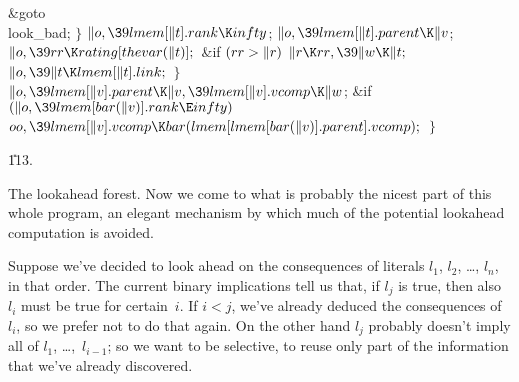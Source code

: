 \&{goto} \\{look\_bad};\6
\4${}\}{}$\2\6
${}\|o,\39\\{lmem}[\|t].\\{rank}\K\\{infty}{}$;\6
${}\|o,\39\\{lmem}[\|t].\\{parent}\K\|v{}$;\6
${}\|o,\39\\{rr}\K\\{rating}[\\{thevar}(\|t)];{}$\6
\&{if} ${}(\\{rr}>\|r){}$\1\5
${}\|r\K\\{rr},\39\|w\K\|t;{}$\2\6
${}\|o,\39\|t\K\\{lmem}[\|t].\\{link};{}$\6
\4${}\}{}$\2\6
${}\|o,\39\\{lmem}[\|v].\\{parent}\K\|v,\39\\{lmem}[\|v].\\{vcomp}\K\|w{}$;\6
\&{if} ${}(\|o,\39\\{lmem}[\\{bar}(\|v)].\\{rank}\E\\{infty}){}$\1\5
${}\\{oo},\39\\{lmem}[\|v].\\{vcomp}\K\\{bar}(\\{lmem}[\\{lmem}[\\{bar}(\|v)].%
\\{parent}].\\{vcomp});{}$\2\6
\4${}\}{}$\2\par
\U113.\fi

The lookahead forest.
Now we come to what is probably the nicest part of this whole program,
an elegant mechanism by which much of the potential lookahead computation
is avoided.

Suppose we've decided to look ahead on the consequences of literals
$l_1$, $l_2$, \dots, $l_n$, in that order. The current binary implications
tell us that, if $l_j$ is true, then also $l_i$ must be true for certain~$i$.
If $i<j$, we've already deduced the consequences of $l_i$, so we prefer
not to do that again. On the other hand $l_j$ probably doesn't imply
all of $l_1$, \dots,~$l_{i-1}$; so we want to be selective, to reuse
only part of the information that we've already discovered.

